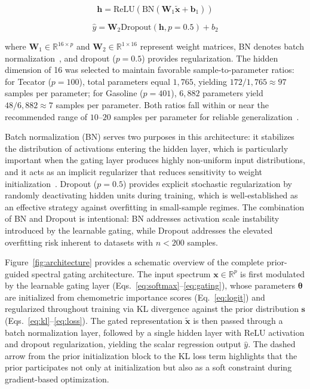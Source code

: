 \documentclass[preprint,12pt]{elsarticle}
\begin{document}
\begin{equation}
\mathbf{h} = \text{ReLU}(\text{BN}(\mathbf{W}_1 \tilde{\mathbf{x}} + \mathbf{b}_1))
\end{equation}

\begin{equation}
\hat{y} = \mathbf{W}_2 \text{Dropout}(\mathbf{h}, p=0.5) + b_2
\end{equation}

\noindent where $\mathbf{W}_1 \in \mathbb{R}^{16 \times p}$ and $\mathbf{W}_2 \in \mathbb{R}^{1 \times 16}$ represent weight matrices, BN denotes batch normalization~\cite{ioffe2015batch}, and dropout ($p=0.5$) provides regularization. The hidden dimension of 16 was selected to maintain favorable sample-to-parameter ratios: for Tecator ($p=100$), total parameters equal $1,765$, yielding $172/1,765 \approx 97$ samples per parameter; for Gasoline ($p=401$), $6,882$ parameters yield $48/6,882 \approx 7$ samples per parameter. Both ratios fall within or near the recommended range of $10$--$20$ samples per parameter for reliable generalization~\cite{lever2016model}.

Batch normalization (BN) serves two purposes in this architecture: it stabilizes the distribution of activations entering the hidden layer, which is particularly important when the gating layer produces highly non-uniform input distributions, and it acts as an implicit regularizer that reduces sensitivity to weight initialization~\cite{ioffe2015batch}. Dropout ($p=0.5$) provides explicit stochastic regularization by randomly deactivating hidden units during training, which is well-established as an effective strategy against overfitting in small-sample regimes. The combination of BN and Dropout is intentional: BN addresses activation scale instability introduced by the learnable gating, while Dropout addresses the elevated overfitting risk inherent to datasets with $n < 200$ samples.

Figure~\ref{fig:architecture} provides a schematic overview of the complete prior-guided spectral gating architecture. The input spectrum $\mathbf{x} \in \mathbb{R}^p$ is first modulated by the learnable gating layer (Eqs.~\ref{eq:softmax}--\ref{eq:gating}), whose parameters $\boldsymbol{\theta}$ are initialized from chemometric importance scores (Eq.~\ref{eq:logit}) and regularized throughout training via KL divergence against the prior distribution $\mathbf{s}$ (Eqs.~\ref{eq:kl}--\ref{eq:loss}). The gated representation $\tilde{\mathbf{x}}$ is then passed through a batch normalization layer, followed by a single hidden layer with ReLU activation and dropout regularization, yielding the scalar regression output $\hat{y}$. The dashed arrow from the prior initialization block to the KL loss term highlights that the prior participates not only at initialization but also as a soft constraint during gradient-based optimization.
\end{document}
